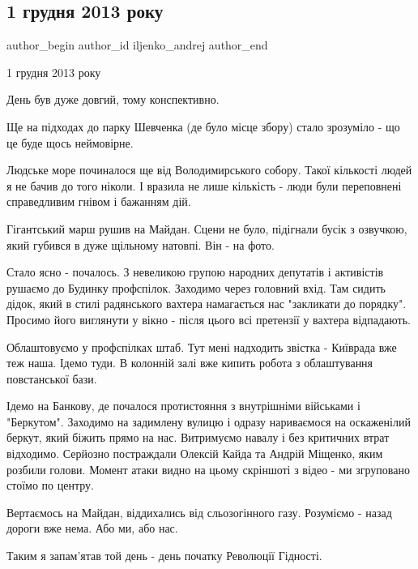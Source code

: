  
 
 
 
 
 
\subsection{1 грудня 2013 року}
\label{sec:01_12_2021.fb.iljenko_andrej.1.maidan_1_dec_2013}
 
\ifcmt
 author_begin
   author_id iljenko_andrej
 author_end
\fi

1 грудня 2013 року

День був дуже довгий, тому конспективно.

Ще на підходах до парку Шевченка (де було місце збору) стало зрозуміло - що це
буде щось неймовірне. 

Людське море починалося ще від Володимирського собору. Такої кількості людей я
не бачив до того ніколи. І вразила не лише кількість - люди були переповнені
справедливим гнівом і бажанням дій.


Гігантський марш рушив на Майдан. Сцени не було, підігнали бусік з озвучкою,
який губився в дуже щільному натовпі. Він - на фото.

Стало ясно - почалось. З невеликою групою народних депутатів і активістів
рушаємо до Будинку профспілок. Заходимо через головний вхід. Там сидить дідок,
який в стилі радянського вахтера намагається нас "закликати до порядку".
Просимо його виглянути у вікно - після цього всі претензії у вахтера
відпадають. 

Облаштовуємо у профспілках штаб. Тут мені надходить звістка - Київрада вже теж
наша. Ідемо туди. В колонній залі вже кипить робота з облаштування повстанської
бази. 

Ідемо на Банкову, де почалося протистояння з внутрішніми військами і
"Беркутом". Заходимо на задимлену вулицю і одразу нариваємося на оскаженілий
беркут, який біжить прямо на нас. Витримуємо навалу і без критичних втрат
відходимо. Серйозно постраждали Олексій Кайда та Андрій Міщенко, яким розбили
голови. Момент атаки видно на цьому скріншоті з відео - ми згруповано стоїмо по
центру. 

Вертаємось на Майдан, віддихались від сльозогінного газу. Розуміємо - назад
дороги вже нема. Або ми, або нас.

Таким я запам'ятав той день - день початку Революції Гідності.

